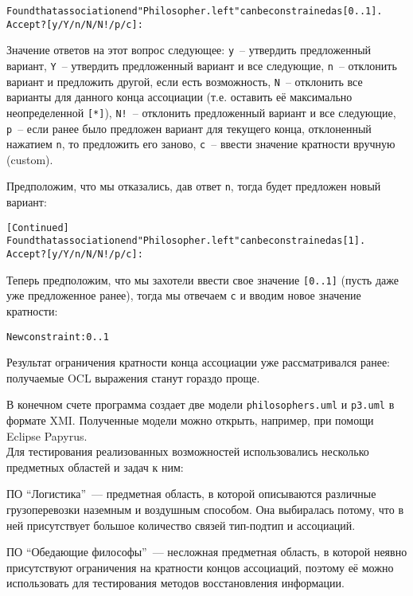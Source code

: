 \begin{alltt}\small
    Found that association end "Philosopher.left" can be constrained as [0..1].
    Accept? [y/Y/n/N/N!/p/c]:
\end{alltt}

Значение ответов на этот вопрос следующее: \texttt{y}~-- утвердить предложенный вариант, \texttt{Y}~-- утвердить предложенный вариант и все следующие, \texttt{n}~-- отклонить вариант и предложить другой, если есть возможность, \texttt{N}~-- отклонить все варианты для данного конца ассоциации (т.е. оставить её максимально неопределенной \texttt{[*]}), \texttt{N!}~-- отклонить предложенный вариант и все следующие, \texttt{p}~-- если ранее было предложен вариант для текущего конца, отклоненный нажатием \texttt{n}, то предложить его заново, \texttt{c}~-- ввести значение кратности вручную (custom).

Предположим, что мы отказались, дав ответ \texttt{n}, тогда будет предложен новый вариант:

\begin{alltt}\small
    [Continued] 
    Found that association end "Philosopher.left" can be constrained as [1].
    Accept? [y/Y/n/N/N!/p/c]:
\end{alltt}

Теперь предположим, что мы захотели ввести свое значение \texttt{[0..1]} (пусть даже уже предложенное ранее), тогда мы отвечаем \texttt{c} и вводим новое значение кратности:

\begin{alltt}\small
    New constraint: 0..1
\end{alltt}

Результат ограничения кратности конца ассоциации уже рассматривался ранее: получаемые OCL выражения станут гораздо проще.

В конечном счете программа создает две модели \texttt{philosophers.uml} и \texttt{p3.uml} в формате XMI. Полученные модели можно открыть, например, при помощи Eclipse Papyrus.
\\

Для тестирования реализованных возможностей использовались несколько предметных областей и задач к ним:

ПО ``Логистика''~--- предметная область, в которой описываются различные грузоперевозки наземным и воздушным способом. Она выбиралась потому, что в ней присутствует большое количество связей тип-подтип и ассоциаций.

ПО ``Обедающие философы''~--- несложная предметная область, в которой неявно присутствуют ограничения на кратности концов ассоциаций, поэтому её можно использовать для тестирования методов восстановления информации.

